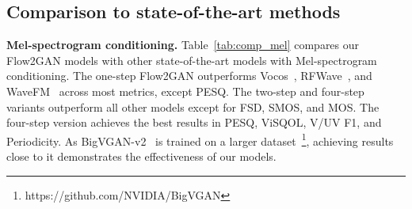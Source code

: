 \vspace{-1em}
\subsection{Comparison to state-of-the-art methods}
\label{ssec:comp_sota}

\noindent\textbf{Mel-spectrogram conditioning.} Table~\ref{tab:comp_mel} compares our Flow2GAN models with other state-of-the-art models with Mel-spectrogram conditioning. 
The one-step Flow2GAN outperforms Vocos~\citep{vocos}, RFWave~\citep{rfwave}, and WaveFM~\citep{wavefm} across most metrics, except PESQ. The two-step and four-step variants outperform all other models except for FSD, SMOS, and MOS. The four-step version achieves the best results in PESQ, ViSQOL, V/UV F1, and Periodicity.
As BigVGAN-v2~\citep{bigvgan} is trained on a larger dataset~\footnote{https://github.com/NVIDIA/BigVGAN}, achieving results close to it demonstrates the effectiveness of our models.


